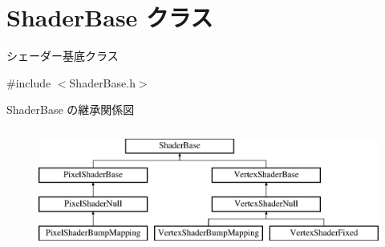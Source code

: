 \hypertarget{class_shader_base}{}\section{Shader\+Base クラス}
\label{class_shader_base}


シェーダー基底クラス  




{\ttfamily \#include $<$Shader\+Base.\+h$>$}

Shader\+Base の継承関係図\begin{figure}[H]
\begin{center}
\leavevmode
\includegraphics[height=4.000000cm]{class_shader_base}
\end{center}
\end{figure}
